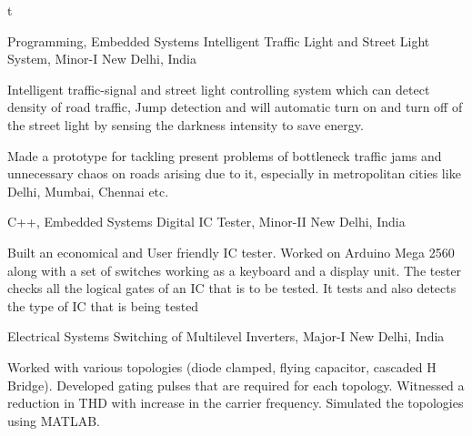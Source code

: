 

t
\begin{cventries}


\cventry
{Programming, Embedded Systems} %
{Intelligent Traffic Light and Street Light System, Minor-I} %
{New Delhi, India} %
{} %
{ %
 \begin{cvitems}
 \item {Intelligent traffic-signal and street light controlling system which can detect density of road traffic, Jump detection and will automatic turn on and turn off of the street light by sensing the darkness intensity to save energy.}
 \item {Made a prototype for tackling present problems of bottleneck traffic jams and unnecessary chaos on roads arising due to it, especially in metropolitan cities like Delhi, Mumbai, Chennai etc.}
 \end{cvitems}
}


\cventry
{C++, Embedded Systems} %
{Digital IC Tester, Minor-II} %
{New Delhi, India} %
{} %
{ %
 \begin{cvitems}
 \item {Built an economical and User friendly IC tester. Worked on Arduino Mega 2560 along with a set of switches working as a keyboard and a display unit. The tester checks all the logical gates of an IC that is to be tested. It tests and also detects the type of IC that is being tested}
 \end{cvitems}
}


\cventry
{Electrical Systems} %
{Switching of Multilevel Inverters, Major-I} %
{New Delhi, India} %
{} %
{ %
 \begin{cvitems}
 \item {Worked with various topologies (diode clamped, flying capacitor, cascaded H Bridge). Developed gating pulses that are required for each topology. Witnessed a reduction in THD with increase in the carrier frequency. Simulated the topologies using MATLAB.}
 \end{cvitems}
}


\end{cventries}
